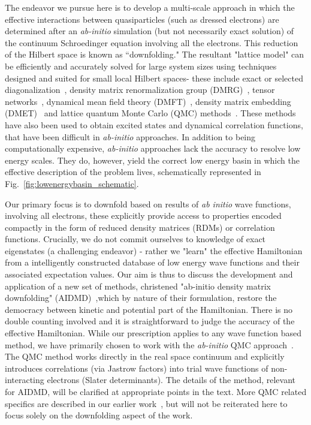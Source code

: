 The endeavor we pursue here is to develop a multi-scale approach in which the effective interactions between quasiparticles (such as dressed electrons) are determined after an \textit{ab-initio} simulation (but not necessarily exact solution) of the continuum Schroedinger equation involving all the electrons. 
This reduction of the Hilbert space is known as ``downfolding."
The resultant "lattice model" can be efficiently and accurately solved for large system sizes using techniques designed and suited for small local Hilbert spaces- these include exact or selected diagonalization~\cite{DeRaedt,Tubman_selci,Holmes_Tubman_Umrigar}, density matrix renormalization group (DMRG)~\cite{White1992}, tensor networks~\cite{PEPS,Changlani_CPS,NeuscammanCPS}, dynamical mean field theory (DMFT)~\cite{Kotliar2006}, density matrix embedding (DMET)~\cite{DMET_2012} and lattice quantum Monte Carlo (QMC) methods~\cite{Scalapino, Trivedi_Ceperley, Zhang_AFQMC, Sandvik_loops, Prokofiev, Booth2009,SQMC,Holmes_Changlani_Umrigar, Booth2013}. 
These methods have also been used to obtain excited states and dynamical correlation functions, that have been difficult in \textit{ab-initio} approaches. 
In addition to being computationally expensive, \textit{ab-initio} approaches lack the accuracy to resolve low energy scales. 
They do, however, yield the correct low energy basin in which the effective description of the problem lives, schematically represented in Fig.~\ref{fig:lowenergybasin_schematic}.

Our primary focus is to downfold based on results of \textit{ab initio} wave functions, involving all electrons, these explicitly provide access to properties encoded compactly in the form of reduced density matrices (RDMs) or correlation functions. 
Crucially, we do not commit ourselves to knowledge of exact eigenstates (a challenging endeavor) - rather we "learn" the effective Hamiltonian from a intelligently constructed database of low energy wave functions and their associated expectation values. 
Our aim is thus to discuss the development and application of a new set of methods, christened "ab-initio density matrix downfolding" (AIDMD)~\cite{Changlani2015},which by nature of their formulation, restore the democracy between kinetic and potential part of the Hamiltonian. 
There is no double counting involved and it is straightforward to judge the accuracy of the effective Hamiltonian. 
While our prescription applies to any wave function based method, we have primarily chosen to work with the \textit{ab-initio} QMC approach~\cite{Ceperley_Alder,Foulkes_review}. 
The QMC method works directly in the real space continuum and explicitly introduces correlations (via Jastrow factors) into trial wave functions of non-interacting electrons (Slater determinants). 
The details of the method, relevant for AIDMD, will be clarified at appropriate points in the text. 
More QMC related specifics are described in our earlier work~\cite{Changlani2015,}, but will not be reiterated here to focus solely on the downfolding aspect of the work. 


